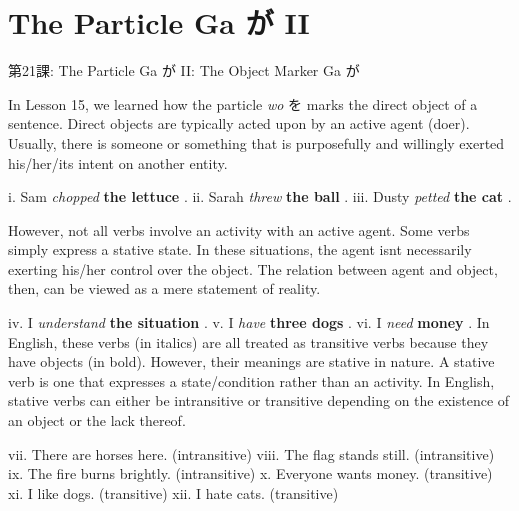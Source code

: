     
\chapter{The Particle Ga が II}

\begin{center}
\begin{Large}
第21課: The Particle Ga が II: The Object Marker Ga が 
\end{Large}
\end{center}
 
\par{ In Lesson 15, we learned how the particle \emph{wo }を marks the direct object of a sentence. Direct objects are typically acted upon by an active agent (doer). Usually, there is someone or something that is purposefully and willingly exerted his\slash her\slash its intent on another entity. }

\par{i. Sam \emph{chopped } \textbf{the lettuce }. \hfill\break
ii. Sarah \emph{threw }\textbf{the ball }. \hfill\break
iii. Dusty \emph{petted } \textbf{the cat }. }

\par{ However, not all verbs involve an activity with an active agent. Some verbs simply express a stative state. In these situations, the agent isn\textquotesingle t necessarily exerting his\slash her control over the object. The relation between agent and object, then, can be viewed as a mere statement of reality. }

\par{iv. I \emph{understand } \textbf{the situation }. \hfill\break
v. I \emph{have } \textbf{three dogs }. \hfill\break
vi. I \emph{need } \textbf{money }. \hfill\break
 \hfill\break
 In English, these verbs (in italics) are all treated as transitive verbs because they have objects (in bold). However, their meanings are stative in nature. A stative verb is one that expresses a state\slash condition rather than an activity. In English, stative verbs can either be intransitive or transitive depending on the existence of an object or the lack thereof. }

\par{vii. There are horses here. (intransitive) \hfill\break
viii. The flag stands still. (intransitive) \hfill\break
ix. The fire burns brightly. (intransitive) \hfill\break
x. Everyone wants money. (transitive) \hfill\break
xi. I like dogs. (transitive) \hfill\break
xii. I hate cats. (transitive) }

